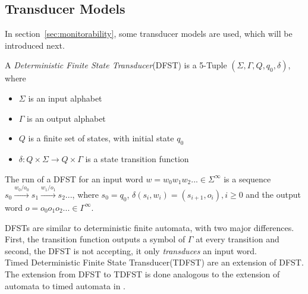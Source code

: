 	\subsection{Transducer Models}
		In section~\ref{sec:monitorability}, some transducer models are used, which will be introduced next.
		\begin{definition}
			A \textit{Deterministic Finite State Transducer}(DFST) is a 5-Tuple $(\Sigma, \Gamma, Q, q_0, \delta)$, where
			\begin{itemize}
				\item
				$\Sigma$ is an input alphabet
				\item
				$\Gamma$ is an output alphabet
				\item
				$Q$ is a finite set of states, with initial state $q_0$
				\item
				$\delta:Q\times\Sigma\rightarrow Q\times\Gamma$ is a state transition function 
			\end{itemize}
			The run of a DFST for an input word $w=w_0w_1w_2...\in\Sigma^\infty$ is a sequence $s_0\xrightarrow{w_0/o_0} s_1\xrightarrow{w_1/o_1} s_2...$, where $s_0=q_0$, $\delta(s_i,w_i)=(s_{i+1}, o_i), i \geq 0$ and the output word $o=o_0o_1o_2...\in\Gamma^\infty$.
		\end{definition}
		DFSTs are similar to deterministic finite automata, with two major differences. First, the transition function outputs a symbol of $\Gamma$ at every transition and second, the DFST is not accepting, it only \textit{transduces} an input word.\\
		Timed Deterministic Finite State Transducer(TDFST) are an extension of DFST. The extension from DFST to TDFST is done analogous to the extension of automata to timed automata in \cite{ALUR1994183}.
